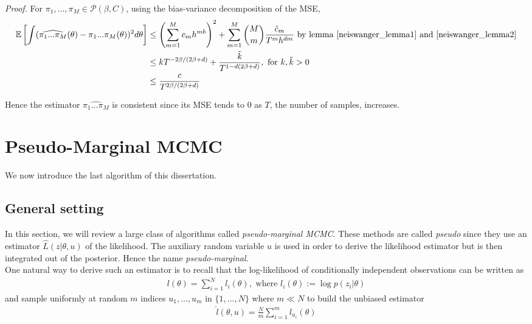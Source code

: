 \documentclass[11pt,a4paper]{report}\usepackage[]{graphicx}\usepackage[]{color}
\begin{document}
\noindent \textit{Proof.}
For $\pi_1,...,\pi_M\in\mathcal P(\beta,C)$, using the bias-variance decomposition of the MSE,
\begin{align*}
\mathbb E \left [\int (\widehat{\pi_1...\pi_M}(\theta)-\pi_1...\pi_M(\theta))^2d\theta\right]&\leq\left(\sum_{m=1}^M c_mh^{mb}\right)^2+\sum_{m=1}^M \binom Mm \frac{\tilde c_m}{T^mh^{dm}}\text{ by lemma \ref{neiswanger_lemma1} and \ref{neiswanger_lemma2}}\\
&\leq kT^{-2\beta/(2\beta+d)} + \frac{\tilde k}{T^{1-d(2\beta+d)}}, \text{ for $k,\tilde k>0$}\\
&\leq \frac{c}{T^{2\beta/(2\beta+d)}}
\end{align*}

Hence the estimator $\widehat{\pi_1...\pi_M}$ is consistent since its MSE tends to $0$ as $T$, the number of samples, increases. 
\newpage
\section{Pseudo-Marginal MCMC}
\label{sec:quiroz_exp}
We now introduce the last algorithm of this dissertation.
\subsection{General setting}
In this section, we will review a large class of algorithms called \textit{pseudo-marginal MCMC}. These methods are called \textit{pseudo} since they use an estimator $\hat{L}(z|\theta,u)$ of the likelihood. The auxiliary random variable $u$ is used in order to derive the likelihood estimator but is then integrated out of the posterior. Hence the name \textit{pseudo-marginal}.\\
One natural way to derive such an estimator is to recall that the log-likelihood of conditionally independent observations can be written as
\begin{align}
\label{eq:quiroz1}
l(\theta)=\sum_{i=1}^N l_i(\theta), \text{ where } l_i(\theta):= \log p(z_i|\theta)
\end{align}
and sample uniformly at random $m$ indices $u_1,...,u_m$ in $\{1,...,N\}$ where $m\ll N$ to build the unbiased estimator 
\begin{align}
\label{eq:quiroz2}
\hat l(\theta,u)=\frac Nm\sum_{i=1}^m l_{u_i}(\theta)
\end{align}
\end{document}

